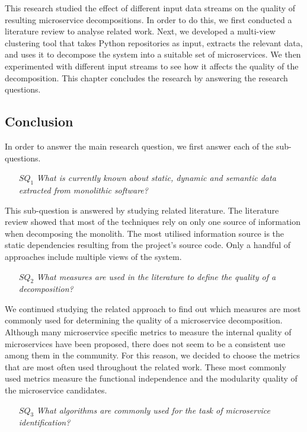 This research studied the effect of different input data streams on the quality of resulting microservice decompositions. In order to do this, we first conducted a literature review to analyse related work. Next, we developed a multi-view clustering tool that takes Python repositories as input, extracts the relevant data, and uses it to decompose the system into a suitable set of microservices. We then experimented with different input streams to see how it affects the quality of the decomposition. 
This chapter concludes the research by answering the research questions. 

\subsection{Conclusion}
In order to answer the main research question, we first answer each of the sub-questions. 

\begin{itemize}
    \item[$SQ_1$] \textit{What is currently known about static, dynamic and semantic data extracted from monolithic software?}
\end{itemize}

This sub-question is answered by studying related literature. The literature review showed that most of the techniques rely on only one source of information when decomposing the monolith. The most utilised information source is the static dependencies resulting from the project's source code. Only a handful of approaches include multiple views of the system. 

\begin{itemize}
    \item[$SQ_2$] \textit{What measures are used in the literature to define the quality of a decomposition?}
\end{itemize}

We continued studying the related approach to find out which measures are most commonly used for determining the quality of a microservice decomposition. Although many microservice specific metrics to measure the internal quality of microservices have been proposed, there does not seem to be a consistent use among them in the community. For this reason, we decided to choose the metrics that are most often used throughout the related work. These most commonly used metrics measure the functional independence and the modularity quality of the microservice candidates.

\begin{itemize}
    \item[$SQ_3$] \textit{What algorithms are commonly used for the task of microservice identification?}
\end{itemize}

